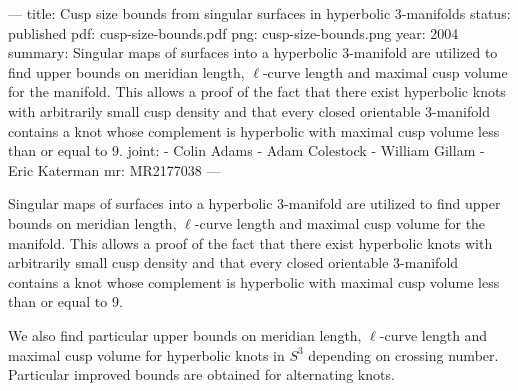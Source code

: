 ---
title: Cusp size bounds from singular surfaces in hyperbolic 3-manifolds
status: published
pdf: cusp-size-bounds.pdf
png: cusp-size-bounds.png
year: 2004
summary: Singular maps of surfaces into a hyperbolic 3-manifold are utilized to find upper bounds on meridian length, $\ell$-curve length and maximal cusp volume for the manifold. This allows a proof of the fact that there exist hyperbolic knots with arbitrarily small cusp density and that every closed orientable 3-manifold contains a knot whose complement is hyperbolic with maximal cusp volume less than or equal to 9.
joint:
  - Colin Adams
  - Adam Colestock
  - William Gillam
  - Eric Katerman
mr: MR2177038
---

Singular maps of surfaces into a hyperbolic 3-manifold are utilized to find upper bounds on meridian length, $\ell$-curve length and maximal cusp volume for the manifold. This allows a proof of the fact that there exist hyperbolic knots with arbitrarily small cusp density and that every closed orientable 3-manifold contains a knot whose complement is hyperbolic with maximal cusp volume less than or equal to 9.

We also find particular upper bounds on meridian length, $\ell$-curve length and maximal cusp volume for hyperbolic knots in $S^3$ depending on crossing number. Particular improved bounds are obtained for alternating knots.
